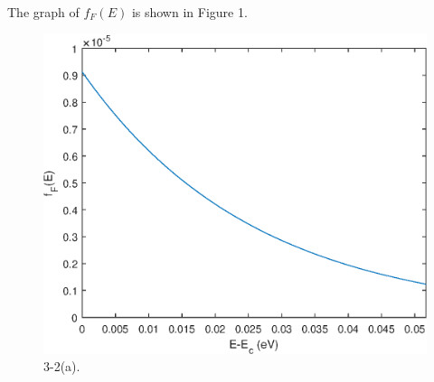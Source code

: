 \documentclass[a4paper]{article}
\begin{document}
The graph of $f_F(E)$ is shown in Figure 1.
\begin{figure}[H]
    \centering
    \includegraphics[width=1\textwidth]{3-2(a).eps}
    \caption{3-2(a).}
\end{figure}
\end{document}
